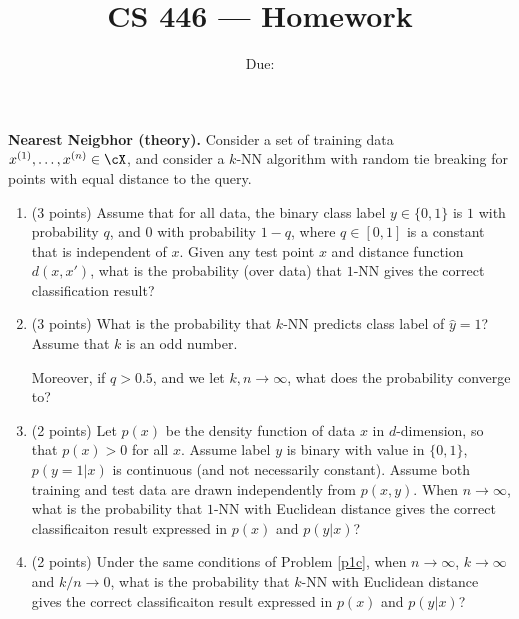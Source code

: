 \documentclass{article}
\title{CS 446 --- Homework \hwno}
\date{Due: \duedate }
\begin{document}
\maketitle




\begin{enumerate}

  \begin{Q}
    \textbf{Nearest Neigbhor (theory).}
    Consider a set of training data $x^{(1)},\ldots, x^{(n)} \in \cX$,
    and consider a $k$-NN algorithm with random tie breaking
    for points with equal distance to the query.
    \begin{enumerate}
      \item (3 points) Assume that for all data, the binary class label $y \in \{0,1\}$ is $1$ 
        with probability $q$, and $0$ with probability $1-q$,
        where $q \in [0,1]$ is a constant that is independent of $x$.
        Given any test point $x$ and distance function $d(x,x')$, what
        is the probability (over data) that $1$-NN gives the
        correct classification result? \label{knn-1}


      \item (3 points) What is the probability that $k$-NN predicts class label
        of $\hat{y}=1$? Assume that $k$ is an odd number. \label{knn-2}

        Moreover, if $q>0.5$, and we
        let $k, n \to \infty$, what does the probability 
        converge to? 


      \item (2 points) Let $p(x)$ be the density function of data $x$ in
        $d$-dimension, so that  $p(x) >0$ for all $x$. Assume label
        $y$ is binary with value in   $\{0,1\}$, $p(y=1|x)$
        is continuous (and not necessarily
        constant). Assume both training and test data are drawn
        independently from $p(x,y)$. 
        When $n \to \infty$, 
        what is the probability that $1$-NN with Euclidean distance gives
        the correct classificaiton result expressed in   $p(x)$ and
        $p(y|x)$? \label{p1c}
        

      \item (2 points)  Under the same conditions of Problem \ref{p1c},
        when $n \to \infty$, $k \to \infty$ and $k/n \to 0$,  what is the probability that $k$-NN with Euclidean distance gives
        the correct classificaiton result expressed in  $p(x)$ and
        $p(y|x)$?
        

\end{enumerate}
\end{Q}
\end{enumerate}
\end{document}
